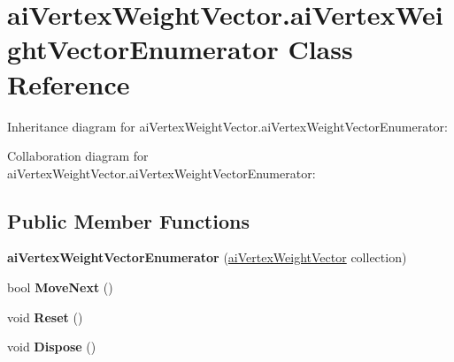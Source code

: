 \hypertarget{classai_vertex_weight_vector_1_1ai_vertex_weight_vector_enumerator}{\section{ai\+Vertex\+Weight\+Vector.\+ai\+Vertex\+Weight\+Vector\+Enumerator Class Reference}
\label{classai_vertex_weight_vector_1_1ai_vertex_weight_vector_enumerator}
}


Inheritance diagram for ai\+Vertex\+Weight\+Vector.\+ai\+Vertex\+Weight\+Vector\+Enumerator\+:


Collaboration diagram for ai\+Vertex\+Weight\+Vector.\+ai\+Vertex\+Weight\+Vector\+Enumerator\+:
\subsection*{Public Member Functions}
\begin{DoxyCompactItemize}
\item 
\hypertarget{classai_vertex_weight_vector_1_1ai_vertex_weight_vector_enumerator_aeb843cb8ea5e4c7bfe9b4a9ec77d2b44}{{\bfseries ai\+Vertex\+Weight\+Vector\+Enumerator} (\hyperlink{classai_vertex_weight_vector}{ai\+Vertex\+Weight\+Vector} collection)}\label{classai_vertex_weight_vector_1_1ai_vertex_weight_vector_enumerator_aeb843cb8ea5e4c7bfe9b4a9ec77d2b44}

\item 
\hypertarget{classai_vertex_weight_vector_1_1ai_vertex_weight_vector_enumerator_a6116d636f562468c824fb4923ef18b05}{bool {\bfseries Move\+Next} ()}\label{classai_vertex_weight_vector_1_1ai_vertex_weight_vector_enumerator_a6116d636f562468c824fb4923ef18b05}

\item 
\hypertarget{classai_vertex_weight_vector_1_1ai_vertex_weight_vector_enumerator_a45b6d3e052e08f88d74ac03ebbcf876d}{void {\bfseries Reset} ()}\label{classai_vertex_weight_vector_1_1ai_vertex_weight_vector_enumerator_a45b6d3e052e08f88d74ac03ebbcf876d}

\item 
\hypertarget{classai_vertex_weight_vector_1_1ai_vertex_weight_vector_enumerator_a88ef37fd6d9093cefb34c5ec7ea0b072}{void {\bfseries Dispose} ()}\label{classai_vertex_weight_vector_1_1ai_vertex_weight_vector_enumerator_a88ef37fd6d9093cefb34c5ec7ea0b072}

\end{DoxyCompactItemize}
